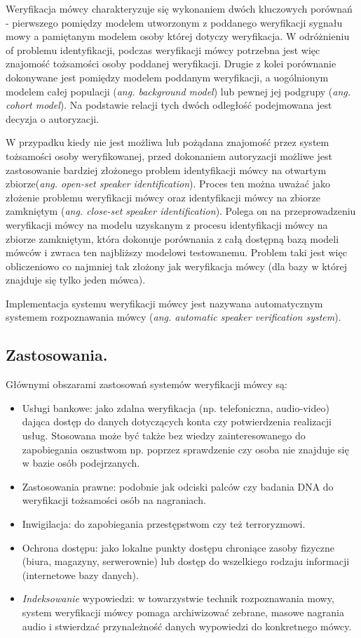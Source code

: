 Weryfikacja mówcy charakteryzuje się wykonaniem dwóch kluczowych porównań - pierwszego pomiędzy modelem utworzonym z poddanego weryfikacji sygnału mowy a pamiętanym modelem osoby której dotyczy weryfikacja. W odróżnieniu of problemu identyfikacji, podczas weryfikacji mówcy potrzebna jest więc znajomość tożsamości osoby poddanej weryfikacji.
Drugie z kolei porównanie dokonywane jest pomiędzy modelem poddanym weryfikacji, a uogólnionym modelem całej populacji (\textit{ang. background model}) lub pewnej jej podgrupy (\textit{ang. cohort model}). Na podstawie relacji tych dwóch odległość podejmowana jest decyzja o autoryzacji.

W przypadku kiedy nie jest możliwa lub pożądana znajomość przez system tożsamości osoby weryfikowanej, przed dokonaniem autoryzacji możliwe jest zastosowanie bardziej złożonego problem identyfikacji mówcy na otwartym zbiorze(\textit{ang. open-set speaker identification}). Proces ten można uważać jako złożenie problemu weryfikacji mówcy oraz identyfikacji mówcy na zbiorze zamkniętym (\textit{ang. close-set speaker identification}). Polega on na przeprowadzeniu weryfikacji mówcy na modelu uzyskanym z procesu identyfikacji mówcy na zbiorze zamkniętym, która dokonuje porównania z całą dostępną bazą modeli mówców i zwraca ten najbliższy modelowi testowanemu. Problem taki jest więc obliczeniowo co najmniej tak złożony jak weryfikacja mówcy (dla bazy w której znajduje się tylko jeden mówca).

Implementacja systemu weryfikacji mówcy jest nazywana automatycznym systemem rozpoznawania mówcy (\textit{ang. automatic speaker verification system}).

\subsection{Zastosowania.}
Głównymi obszarami zastosowań systemów weryfikacji mówcy są:
\begin{itemize}
  \item Usługi bankowe: jako zdalna weryfikacja (np. telefoniczna, audio-video) dająca dostęp do danych dotyczących konta czy potwierdzenia realizacji usług. Stosowana może być także bez wiedzy zainteresowanego do zapobiegania oszustwom np. poprzez sprawdzenie czy osoba nie znajduje się w bazie osób podejrzanych.
  \item Zastosowania prawne: podobnie jak odciski palców czy badania DNA do weryfikacji tożsamości osób na nagraniach.
  \item Inwigilacja: do zapobiegania przestępstwom czy też terroryzmowi.
  \item Ochrona dostępu: jako lokalne punkty dostępu chroniące zasoby fizyczne (biura, magazyny, serwerownie) lub dostęp do wszelkiego rodzaju informacji (internetowe bazy danych).
  \item \textit{Indeksowanie} wypowiedzi: w towarzystwie technik rozpoznawania mowy, system weryfikacji mówcy pomaga archiwizować zebrane, masowe nagrania audio i stwierdzać przynależność danych wypowiedzi do konkretnego mówcy.
\end{itemize}
